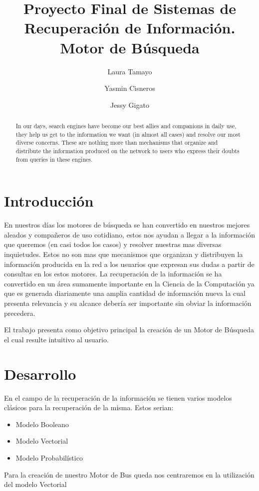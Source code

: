 \documentclass[runningheads]{llncs}
\begin{document}
\title{Proyecto Final de Sistemas de Recuperación de Información. Motor de Búsqueda}

\author{Laura Tamayo  \and 
Yasmin Cisneros \and 
Jessy Gigato}
\maketitle
\begin{abstract}
	In our days, search engines have become our best allies and companions in daily use, they help us get to the information we want (in almost all cases) and resolve our most diverse concerns. These are nothing more than mechanisms that organize and distribute the information produced on the network to users who express their doubts from queries in these engines.
\end{abstract}

\section*{Introducción}

En nuestros días los motores de búsqueda se han convertido en nuestros mejores aleados y compañeros de uso cotidiano, estos nos ayudan a llegar a la información que queremos (en casi todos los casos) y resolver nuestras mas diversas inquietudes. Estos no son mas que mecanismos que organizan y distribuyen la información producida en la red a los usuarios que expresan sus dudas a partir de consultas en los estos motores. La recuperación de la información se ha convertido en un área sumamente importante en la Ciencia de la Computación ya que es generada diariamente una amplia cantidad de información nueva la cual presenta relevancia y su alcance debería ser importante sin obviar la información precedera.

El trabajo presenta como objetivo principal la creación de un Motor de Búsqueda el cual resulte intuitivo al usuario.

\section*{Desarrollo}
En el campo de la recuperación de la información se tienen varios modelos clásicos para la recuperación de la misma. Estos serian:
\begin{itemize}
	\item Modelo Booleano
	\item Modelo Vectorial
	\item Modelo Probabilístico
\end{itemize}
Para la creación de nuestro Motor de Bus queda nos centraremos en la utilización del modelo Vectorial
\end{document}
